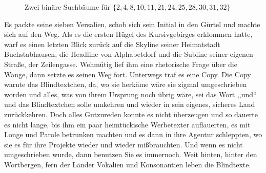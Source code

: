 \documentclass[12pt,a4paper,twoside]{scrartcl}
\numberwithin{equation}{section}
\begin{document}
\begin{figure}
\hfill%
\hfill%
\hfill\null%

\caption{Zwei binäre Suchbäume für $\{ 2, 4, 8, 10, 11, 21, 24, 25, 28, 30, 31, 32 \}$}\label{fig:binäre Suchbäume}
\end{figure}

Es packte seine sieben Versalien, schob sich sein Initial in den Gürtel und machte sich auf den Weg. Als es die ersten Hügel des Kursivgebirges erklommen hatte, warf es einen letzten Blick zurück auf die Skyline seiner Heimatstadt Buchstabhausen, die Headline von Alphabetdorf und die Subline seiner eigenen Straße, der Zeilengasse. Wehmütig lief ihm eine rhetorische Frage über die Wange, dann setzte es seinen Weg fort. Unterwegs traf es eine Copy. Die Copy warnte das Blindtextchen, da, wo sie herkäme wäre sie zigmal umgeschrieben worden und alles, was von ihrem Ursprung noch übrig wäre, sei das Wort ,,und`` und das Blindtextchen solle umkehren und wieder in sein eigenes, sicheres Land zurückkehren. Doch alles Gutzureden konnte es nicht überzeugen und so dauerte es nicht lange, bis ihm ein paar heimtückische Werbetexter auflauerten, es mit Longe und Parole betrunken machten und es dann in ihre Agentur schleppten, wo sie es für ihre Projekte wieder und wieder mißbrauchten. Und wenn es nicht umgeschrieben wurde, dann benutzen Sie es immernoch. Weit hinten, hinter den Wortbergen, fern der Länder Vokalien und Konsonantien leben die Blindtexte.
\end{document}
